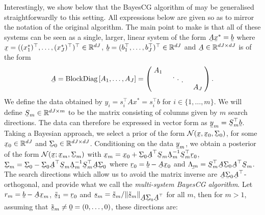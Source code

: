\documentclass[twoside]{article}
\newcommand\barbelow[1]{\stackunder[1.2pt]{$#1$}{\rule{.8ex}{.075ex}}}
\newcommand{\diagentry}[1]{\mathmakebox[1.8em]{#1}}
\newcommand{\xddots}{%
  \raise 4pt \hbox {.}
  \mkern 6mu
  \raise 1pt \hbox {.}
  \mkern 6mu
  \raise -2pt \hbox {.}
}
\begin{document}
Interestingly, we show below that the BayesCG algorithm of \cite{Cockayne2019} may be generalised straightforwardly to this setting. All expressions below are given so as to mirror the notation of the original algorithm. The main point to make is that all of these systems can be seen as a single, larger, linear system of the form $ \barbelow{A} \barbelow{x}^* = \barbelow{b}$ where $\barbelow{x} = ((x^*_1)^\top,\ldots,(x^*_J)^\top)^\top \in \mathbb{R}^{dJ}$, $\barbelow{b} = (b_1^\top,\ldots,b_J^\top)^\top \in \mathbb{R}^{dJ}$ and $\barbelow{A} \in \mathbb{R}^{dJ \times dJ}$ is of the form
\begin{align*}
	\barbelow{A} = \text{BlockDiag}\left[A_1,\ldots,A_J\right] = 
	\begin{pmatrix}
    \diagentry{A_1}\\
    &\diagentry{\xddots}\\
    &&\diagentry{A_J}\\
	\end{pmatrix}.
	\end{align*}
 We define the data obtained by $y_{i} = s_{i}^\top A x^* = s_{i}^\top b$ for $i \in \{1,\ldots,m\}$. We will define $\barbelow{S}_m \in \mathbb{R}^{dJ \times m}$ to be the matrix consisting of columns given by $m$ search directions. The data can therefore be expressed in vector form as $\barbelow{y}_m = \barbelow{S}_m^\top \barbelow{b}$. Taking a Bayesian approach, we select a prior of the form $\mathcal{N}(\barbelow{x},\barbelow{x}_0,\barbelow{\Sigma}_0)$, for some $\barbelow{x}_0 \in \mathbb{R}^{dJ}$ and $\barbelow{\Sigma}_0 \in \mathbb{R}^{dJ \times dJ}$. Conditioning on the data $\barbelow{y}_m$, we obtain a posterior of the form $\mathcal{N}(\barbelow{x} ; \barbelow{x}_m,\barbelow{\Sigma}_m)$ with $\barbelow{x}_m  = \barbelow{x}_0 + \barbelow{\Sigma}_0 \barbelow{A}^\top \barbelow{S}_m \barbelow{\Lambda}_m^{-1} \barbelow{S}_m^\top \barbelow{r}_0$, $\barbelow{\Sigma}_m  = \barbelow{\Sigma}_0 - \barbelow{\Sigma}_0 \barbelow{A}^\top \barbelow{S}_m \barbelow{\Lambda}_{m}^{-1} \barbelow{S}_m^\top \barbelow{A} \barbelow{\Sigma}_0$ where $\barbelow{r}_0 = \barbelow{b} - \barbelow{A} \barbelow{x}_0$ and $\barbelow{\Lambda_m} = \barbelow{S}_m^\top \barbelow{A} \barbelow{\Sigma}_0 \barbelow{A}^\top \barbelow{S}_m$. The search directions which allow us to avoid the matrix inverse are $\barbelow{A} \barbelow{\Sigma}_0 \barbelow{A}^\top$-orthogonal, and provide what we call the \emph{multi-system BayesCG algorithm}. Let $r_m = \barbelow{b} - \barbelow{A} \barbelow{x}_m$, $\barbelow{\tilde{s}}_1 = \barbelow{r}_0$ and $\barbelow{s}_m = \barbelow{\tilde{s}}_m/\|\barbelow{\tilde{s}}_m\|_{\barbelow{A} \barbelow{\Sigma}_0 \barbelow{A}^\top}$ for all $m$, then for $m>1$, assuming that $\tilde{\barbelow{s}}_m \neq \barbelow{0} = (0,\ldots,0)$, these directions are:
\end{document}
